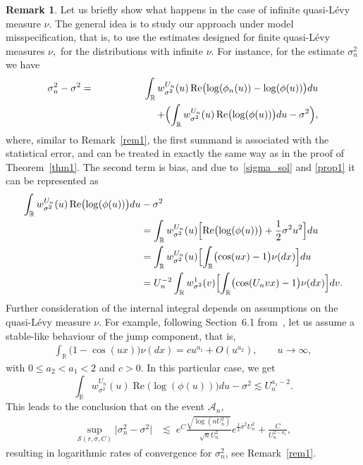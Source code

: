 \documentclass[a4paper,11pt]{article}
\theoremstyle{definition}
\newtheorem{remark}{Remark}
\newcommand{\R}{{\mathbb{R}}}
\newcommand{\1}{\mathbb{I}}
\newcommand{\A}{\mathscr{A}}
\renewcommand{\A}{\mathcal{A}}
\def\R{\mathbb{R}}
\newcommand{\e}{e}
\renewcommand{\Re}{\operatorname{Re}}
\theoremstyle{remark}
\begin{document}
 \begin{remark} Let us briefly show what happens in the case of infinite quasi-L{\'e}vy measure \(\nu.\)  The general idea is to study our approach under model misspecification, that is, to use the estimates designed for finite  quasi-L{\'e}vy measures \(\nu,\)  for the distributions with infinite \(\nu\). For instance, for the estimate \(\sigma_n^2\) we have 
 \begin{eqnarray*}
  \sigma^2_n - \sigma^2 &=& \int_{\R} w^{U_n}_{\sigma^2}(u)\Re\bigl(\log(\phi_n(u)) - \log(\phi(u))\bigr)du \\
&&    \hspace{2cm}+ \Bigl( 
\int_{\R} w^{U_n}_{\sigma^2}(u)\Re\bigl(\log(\phi(u))\bigr)du 
- \sigma^2\Bigr),
\end{eqnarray*}
where, similar to Remark~\ref{rem1}, the first summand is associated with the statistical error, and can be treated in exactly the same way as in the proof of Theorem~\ref{thm1}. The second term is bias, and due to~\eqref{sigma_sol} and \eqref{prop1} it can be represented as  
\begin{align*}
\int_{\R} w^{U_n}_{\sigma^2}(u)\Re\bigl(\log(\phi(u))\bigr)du 
&- \sigma^2\\
&=
\int_{\R} w^{U_n}_{\sigma^2}(u)
\Bigl[\Re\bigl(\log(\phi(u))\bigr)+ \frac{1}{2} \sigma^2 u^2
\Bigr]du \\
&=
\int_{\R} w^{U_n}_{\sigma^2}(u)
\Bigl[\int_{\R} \bigl(
\cos(ux) - 1 
\bigr) \nu(dx) \Bigr]du\\
&=
U_n^{-2}
\int_{\R} w^{1}_{\sigma^2}(v)
\Bigl[\int_{\R} \bigl(
\cos(U_n v x) - 1 
\bigr) \nu(dx) \Bigr]dv.
\end{align*}
 Further consideration of the internal integral depends on assumptions on the quasi-L{\'e}vy measure \(\nu\). For example, following Section~6.1 from~\cite{BR2015}, let us assume a stable-like behaviour of the jump component, that is, 
 \begin{eqnarray*}
\int_{\R} \bigl(
1- \cos(ux) 
\bigr) \nu(dx) = c u^{a_1} +O(u^{a_2}), \qquad u \to \infty,
\end{eqnarray*}
with \(0 \leq a_2 <a_1<2\) and \(c>0\). In this particular case, we get \[\int_{\R} w^{U_n}_{\sigma^2}(u)\Re\bigl(\log(\phi(u))\bigr)du 
- \sigma^2 \lesssim U_n^{a_1-2}.\] This leads to the conclusion that on the event \(\A_n,\)
\begin{align*}
\sup_{\mathcal{S}(r, \bar{\sigma}, C)}
\bigl|\sigma_n^2 - \sigma^2
\bigr| &\lesssim \;
\e^{C}
\frac{\sqrt{\log(nU_n^2)}}{\sqrt{n}U_n^{2}}
e^{\frac{1}{2}\overline{\sigma}^2U_n^2} +   \frac{C}{U_n^{2-a_1}},
\end{align*}
resulting in logarithmic rates of convergence for \(\sigma_n^2\), see Remark~\ref{rem1}.
 \end{remark}
\end{document}
